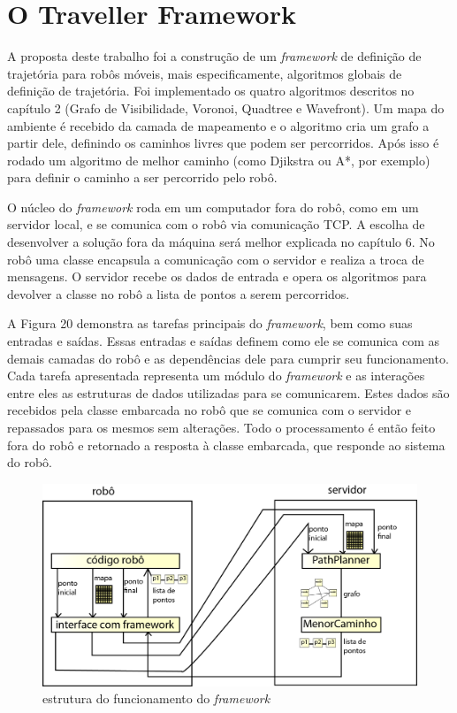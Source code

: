\chapter[O Traveller Framework]{O Traveller Framework}

A proposta deste trabalho foi a construção de um \textit{framework} de definição de trajetória para robôs móveis, mais especificamente, algoritmos globais de definição de trajetória. Foi implementado os quatro algoritmos descritos no capítulo 2 (Grafo de Visibilidade, Voronoi, Quadtree e Wavefront). Um mapa do ambiente é recebido da camada de mapeamento e o algoritmo cria um grafo a partir dele, definindo os caminhos livres que podem ser percorridos. Após isso é rodado um algoritmo de melhor caminho (como Djikstra ou A*, por exemplo) para definir o caminho a ser percorrido pelo robô. 

O núcleo do \textit{framework} roda em um computador fora do robô, como em um servidor local, e se comunica com o robô via comunicação TCP. A escolha de desenvolver a solução fora da máquina será melhor explicada no capítulo 6. No robô uma classe encapsula a comunicação com o servidor e realiza a troca de mensagens. O servidor recebe os dados de entrada e opera os algoritmos para devolver a classe no robô a lista de pontos a serem percorridos.

A Figura 20 demonstra as tarefas principais do \textit{framework}, bem como suas entradas e saídas. Essas entradas e saídas definem como ele se comunica com as demais camadas do robô e as dependências dele para cumprir seu funcionamento. Cada tarefa apresentada representa um módulo do \textit{framework} e as interações entre eles as estruturas de dados utilizadas para se comunicarem. Estes dados são recebidos pela classe embarcada no robô que se comunica com o servidor e repassados para os mesmos sem alterações. Todo o processamento é então feito fora do robô e retornado a resposta à classe embarcada, que responde ao sistema do robô.
 
\begin{figure}[h]
	\centering
	\label{fig20}
		\includegraphics[keepaspectratio=true,scale=0.9]{figuras/framework.png}
	\caption{estrutura do funcionamento do \textit{framework}}
\end{figure} 

